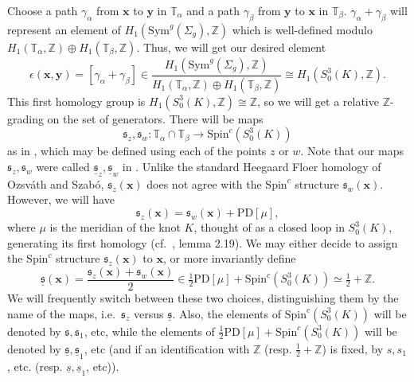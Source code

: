 \documentclass{gtart_h}
\theoremstyle{definition}
\newcommand\relspinc{\underline{\spinc}}
\newcommand\x{\mathbf x}
\newcommand\y{\mathbf y}
\newcommand\PD{\mathrm{PD}}
\newcommand{\spinc}{\mathfrak s}
\newcommand{\Z}{\mathbb{Z}}
\newcommand{\SpinC}{{\mathrm{Spin}}^c}
\newcommand\Sym{\mathrm{Sym}}
\begin{document}
Choose a path $\gamma_\alpha$ from $\x$ to $\y$ in $\mathbb{T}_\alpha$ and a path
$\gamma_\beta$ from $\y$ to $\x$ in $\mathbb{T}_\beta$. $\gamma_\alpha +\gamma_\beta$
will represent an element of $H_1(\Sym^g(\Sigma_g),\mathbb{Z})$ which is well-defined
modulo $H_1(\mathbb{T}_\alpha, \mathbb{Z})\oplus H_1(\mathbb{T}_\beta,\mathbb{Z})$.
Thus, we will get our desired element
\begin{displaymath}
\epsilon(\x,\y)=[\gamma_\alpha+\gamma_\beta]\in
\frac{H_1(\Sym^g(\Sigma_g),\mathbb{Z})}
{H_1(\mathbb{T}_\alpha, \mathbb{Z})\oplus H_1(\mathbb{T}_\beta,\mathbb{Z})}
\cong H_1(S^3_0(K),\mathbb{Z}).
\end{displaymath}
This first homology group is $H_1(S^3_0(K),\mathbb{Z})\cong \mathbb{Z}$, so we will
get a relative $\mathbb{Z}$-grading on the set of generators. There will be  maps
$$\spinc_z,\spinc_w:\mathbb{T}_\alpha \cap \mathbb{T}_\beta \rightarrow \SpinC(S^3_0(K))$$
as in \cite{OS-knot,OS-3m1},
which may be defined using each of the points $z$ or $w$. Note that our maps $\spinc_z,\spinc_w$
were called $\relspinc_z,\relspinc_w$ in \cite{OS-knot,OS-3m1}.
Unlike the standard Heegaard Floer homology of Ozsv\'ath and Szab\'o, $\spinc_z(\x)$ does not
agree with the $\SpinC$ structure $\spinc_w(\x)$. However, we will have
$$\spinc_z(\x)=\spinc_w(\x)+\text{PD}[\mu],$$ where $\mu $ is the meridian of the knot $K$,
thought of as a closed loop in $S^3_0(K)$, generating its first
homology (cf.\ \cite{OS-knot}, lemma 2.19). We may either decide
to assign the $\SpinC$ structure $\spinc_z(\x)$ to $\x$, or more invariantly define
$$\relspinc(\x)=\frac{\spinc_z(\x)+\spinc_w(\x)}{2}\in \tfrac{1}{2}\text{PD}[\mu]+\SpinC(S^3_0(K))\simeq
\tfrac{1}{2}+\Z.$$
We will frequently switch between these two choices, distinguishing them by the name of the maps, i.e.\
$\spinc_z$ versus $\relspinc$.
Also, the elements of $\SpinC(S^3_0(K))$ will be denoted by $\spinc,\spinc_1$, etc,
while the elements of $\frac{1}{2}\PD[\mu]+\SpinC(S^3_0(K))$ will be denoted by
$\relspinc,\relspinc_1$, etc (and if an identification with $\Z$
(resp. $\tfrac{1}{2}+\Z$) is fixed, by $s,s_1$,
etc. (resp. $\underline{s},\underline{s}_1$, etc)).
\end{document}
